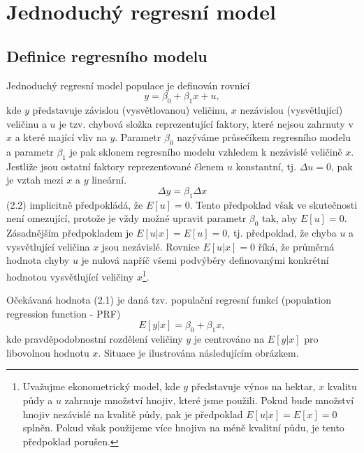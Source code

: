 \chapter{Jednoduchý regresní model}

\section{Definice regresního modelu}

Jednoduchý regresní model populace je definován rovnicí
\begin{equation}
y = \beta_0 + \beta_1 x + u,
\end{equation}
kde $y$ představuje závislou (vysvětlovanou) veličinu, $x$ nezávislou (vysvětlující) veličinu a $u$ je tzv. 
chybová složka reprezentující faktory, které nejsou zahrnuty v $x$ a které mající vliv na $y$. Parametr $\beta_0$ nazýváme 
průsečíkem regresního modelu a parametr $\beta_1$ je pak sklonem regresního modelu vzhledem k nezávislé veličině $x$. Jestliže jsou ostatní faktory 
reprezentované členem $u$ konstantní, tj. $\Delta u = 0$, pak je vztah mezi $x$ a $y$ lineární.
\begin{equation}
\Delta y = \beta_1 \Delta x
\end{equation}
(2.2) implicitně předpokládá, že $E[u] = 0$. Tento předpoklad však ve skutečnosti není 
omezující, protože je vždy možné upravit parametr $\beta_0$ tak, aby $E[u] = 0$. Zásadnějším předpokladem 
je $E[u|x] = E[u] = 0$, tj. předpoklad, že chyba $u$ a vysvětlující veličina $x$ jsou nezávislé. Rovnice $E[u|x] = 0$ říká, že 
průměrná hodnota chyby $u$ je nulová napříč všemi podvýběry definovanými konkrétní hodnotou vysvětlující veličiny
$x$\footnote{Uvažujme ekonometrický model, kde $y$ představuje výnos na hektar, $x$ kvalitu půdy a $u$ zahrnuje 
množství hnojiv, které jsme použili. Pokud bude množství hnojiv nezávislé na kvalitě půdy, pak je předpoklad 
$E[u|x] = E[x] = 0$ splněn. Pokud však použijeme více hnojiva na méně kvalitní půdu, je tento předpoklad porušen.}.

Očekávaná hodnota (2.1) je daná tzv. populační regresní funkcí (population regression function - PRF)
\begin{equation}
E[y|x] = \beta_0 + \beta_1 x,
\end{equation}
kde pravděpodobnostní rozdělení veličiny $y$ je centrováno na $E[y|x]$ pro libovolnou hodnotu $x$. Situace je 
ilustrována následujícím obrázkem.

